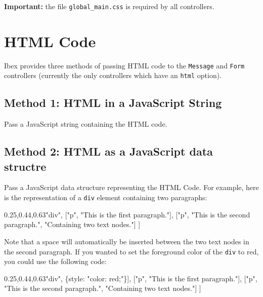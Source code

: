 \documentclass[
]{article}
\newenvironment{Shaded}{}{}
\newcommand{\DataTypeTok}[1]{\textcolor[rgb]{0.56,0.13,0.00}{#1}}
\newcommand{\NormalTok}[1]{#1}
\newcommand{\OperatorTok}[1]{\textcolor[rgb]{0.40,0.40,0.40}{#1}}
\newcommand{\StringTok}[1]{\textcolor[rgb]{0.25,0.44,0.63}{#1}}
\begin{document}
\textbf{Important:} the file \texttt{global\_main.css} is required by
all controllers.

\hypertarget{html-code}{%
\section{HTML Code}\label{html-code}}

Ibex provides three methods of passing HTML code to the \texttt{Message}
and \texttt{Form} controllers (currently the only controllers which have
an \texttt{html} option).

\hypertarget{method-1-html-in-a-javascript-string}{%
\subsection{Method 1: HTML in a JavaScript
String}\label{method-1-html-in-a-javascript-string}}

Pass a JavaScript string containing the HTML code.

\hypertarget{method-2-html-as-a-javascript-data-structre}{%
\subsection{Method 2: HTML as a JavaScript data
structre}\label{method-2-html-as-a-javascript-data-structre}}

Pass a JavaScript data structure representing the HTML Code. For
example, here is the representation of a \texttt{div} element containing
two paragraphs:

\begin{Shaded}
\begin{Highlighting}[]
\NormalTok{    [}\StringTok{"div"}\OperatorTok{,}
\NormalTok{        [}\StringTok{"p"}\OperatorTok{,} \StringTok{"This is the first paragraph."}\NormalTok{]}\OperatorTok{,}
\NormalTok{        [}\StringTok{"p"}\OperatorTok{,} \StringTok{"This is the second paragraph."}\OperatorTok{,} \StringTok{"Containing two text nodes."}\NormalTok{]}
\NormalTok{    ]}
\end{Highlighting}
\end{Shaded}

Note that a space will automatically be inserted between the two text
nodes in the second paragraph. If you wanted to set the foreground color
of the \texttt{div} to red, you could use the following code:

\begin{Shaded}
\begin{Highlighting}[]
\NormalTok{    [[}\StringTok{"div"}\OperatorTok{,}\NormalTok{ \{}\DataTypeTok{style}\OperatorTok{:} \StringTok{"color: red;"}\NormalTok{\}]}\OperatorTok{,}
\NormalTok{        [}\StringTok{"p"}\OperatorTok{,} \StringTok{"This is the first paragraph."}\NormalTok{]}\OperatorTok{,}
\NormalTok{        [}\StringTok{"p"}\OperatorTok{,} \StringTok{"This is the second paragraph."}\OperatorTok{,} \StringTok{"Containing two text nodes."}\NormalTok{]}
\NormalTok{    ]}
\end{Highlighting}
\end{Shaded}
\end{document}

